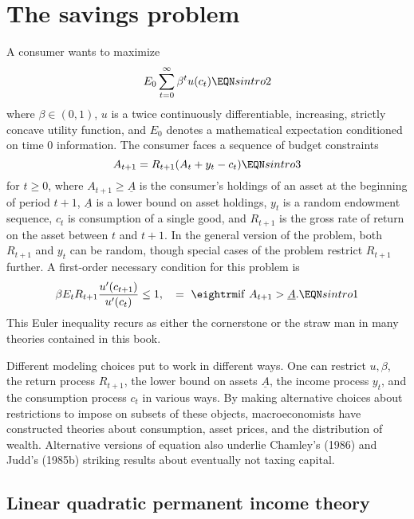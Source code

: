 \section{The savings problem}
A consumer  wants to maximize
$$E_0 \sum_{t=0}^\infty \beta^t u(c_t) \EQN sintro2 $$
where $\beta \in (0,1)$, $u$ is a twice continuously
differentiable, increasing, strictly concave utility function, and
$E_0$ denotes a mathematical expectation conditioned on time $0$
information. The consumer faces a sequence of budget
constraints
$$ A_{t+1} = R_{t+1} (A_t  + y_t -c_t) \EQN sintro3 $$
for $t\geq 0$,
where $A_{t+1} \geq \underline A$ is the consumer's holdings of an asset at the beginning
of period $t+1$, $\underline A$ is a lower bound on asset holdings,
 $y_t$ is a random endowment sequence, $c_t$ is consumption
of a single good, and $R_{t+1}$ is the gross rate of return on the asset
between $t$ and $t+1$.  In the general version of the problem,
both $R_{t+1}$ and $y_t$ can be random,  though  special cases of the
problem restrict $R_{t+1}$ further.
  A first-order necessary condition for this problem is
$$ \beta  E_t R_{t+1} {u'(c_{t+1}) \over u'(c_t)} \leq 1, \quad
=  \  {\rm if} \ A_{t+1} > \underline A. \EQN sintro1 $$
This Euler inequality recurs as either the cornerstone or the
straw man in many theories
contained in this book.

Different modeling choices
put  to work in different ways. One
 can restrict $u, \beta$, the return process
 $R_{t+1}$, the lower bound on assets $\underline A$,
 the income process $y_t$, and   the consumption
process $c_t$ in various ways.
By making alternative choices about restrictions
to impose on subsets of these objects, macroeconomists have constructed
theories  about consumption, asset prices, and the distribution of
wealth.  Alternative versions of equation  also underlie Chamley's (1986)
 and Judd's (1985b)
 striking
results about eventually not taxing capital.

\subsection{Linear quadratic permanent income theory}

